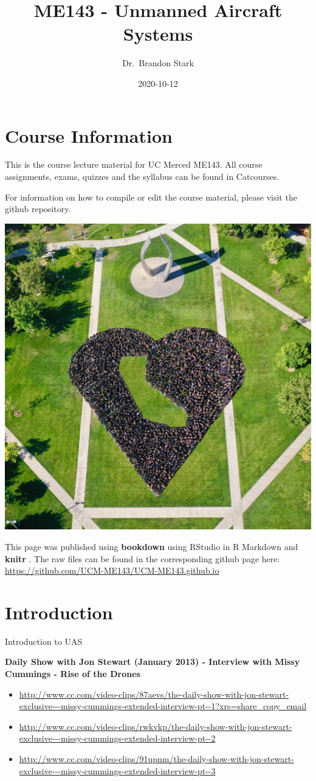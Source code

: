 \documentclass[
]{book}
\title{ME143 - Unmanned Aircraft Systems}
\author{Dr.~Brandon Stark}
\date{2020-10-12}
\providecommand{\tightlist}{%
  \setlength{\itemsep}{0pt}\setlength{\parskip}{0pt}}
\theoremstyle{definition}
\theoremstyle{definition}
\theoremstyle{definition}
\theoremstyle{remark}
\begin{document}
\maketitle

{
\setcounter{tocdepth}{1}
\tableofcontents
}
\hypertarget{course-information}{%
\chapter{Course Information}\label{course-information}}

This is the course lecture material for UC Merced ME143. All course assignments, exams, quizzes and the syllabus can be found in Catcourses.

For information on how to compile or edit the course material, please visit the github repository.

\begin{center}\includegraphics[width=0.5\linewidth]{images/general/UCM_heart} \end{center}

This page was published using \textbf{bookdown}\citep{R-bookdown} using RStudio in R Markdown and \textbf{knitr} \citep{xie2015}. The raw files can be found in the corresponding github page here: \url{https://github.com/UCM-ME143/UCM-ME143.github.io}

\hypertarget{ch-intro}{%
\chapter{Introduction}\label{ch-intro}}

Introduction to UAS

\textbf{Daily Show with Jon Stewart (January 2013) - Interview with Missy Cummings - Rise of the Drones}

\begin{itemize}
\tightlist
\item
  \url{http://www.cc.com/video-clips/87aevs/the-daily-show-with-jon-stewart-exclusive---missy-cummings-extended-interview-pt--1?xrs=share_copy_email}
\item
  \url{http://www.cc.com/video-clips/rwkvkp/the-daily-show-with-jon-stewart-exclusive---missy-cummings-extended-interview-pt--2}
\item
  \url{http://www.cc.com/video-clips/91upnm/the-daily-show-with-jon-stewart-exclusive---missy-cummings-extended-interview-pt--3}
\end{itemize}
\end{document}
